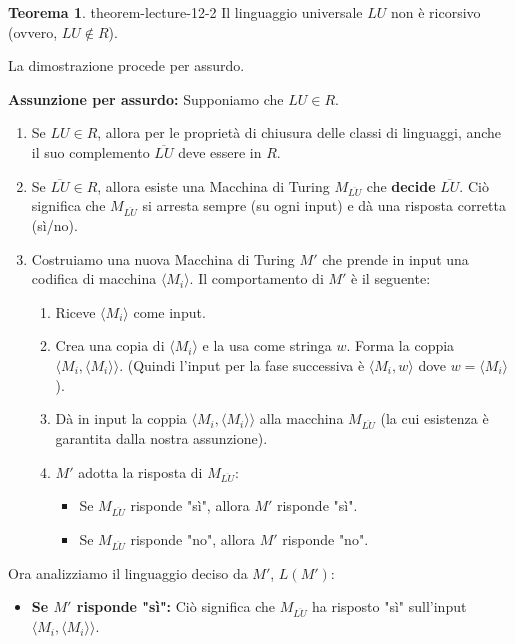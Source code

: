 \documentclass[a4paper]{article}
\makeatletter
\theoremstyle{definition} %
\newtheorem{theorem}{Teorema}
[section] %
\renewenvironment{proof}[1][\proofname]{\par
  \pushQED{\qed}%
  \normalfont \topsep6\p@\@plus6\p@\relax
  \trivlist
  \item[\hskip\labelsep
        \bfseries
    #1\@addpunct{.}]\ignorespaces
}{%
  \popQED\endtrivlist\@endpefalse
}
\makeatother
\begin{document}
\begin{theorem}{}{{ theorem-lecture-12-2 }}
Il linguaggio universale $LU$ non è ricorsivo (ovvero, $LU \notin R$).
\end{theorem}
\begin{proof}
La dimostrazione procede per assurdo.

\textbf{Assunzione per assurdo:} Supponiamo che $LU \in R$.
\begin{enumerate}
    \item Se $LU \in R$, allora per le proprietà di chiusura delle classi di linguaggi, anche il suo complemento $\overline{LU}$ deve essere in $R$.
    \item Se $\overline{LU} \in R$, allora esiste una Macchina di Turing $M_{\overline{LU}}$ che \textbf{decide} $\overline{LU}$. Ciò significa che $M_{\overline{LU}}$ si arresta sempre (su ogni input) e dà una risposta corretta (sì/no).
    \item Costruiamo una nuova Macchina di Turing $M'$ che prende in input una codifica di macchina $\langle M_i \rangle$. Il comportamento di $M'$ è il seguente:
    \begin{enumerate}
        \item Riceve $\langle M_i \rangle$ come input.
        \item Crea una copia di $\langle M_i \rangle$ e la usa come stringa $w$. Forma la coppia $\langle M_i, \langle M_i \rangle \rangle$. (Quindi l'input per la fase successiva è $\langle M_i, w \rangle$ dove $w = \langle M_i \rangle$).
        \item Dà in input la coppia $\langle M_i, \langle M_i \rangle \rangle$ alla macchina $M_{\overline{LU}}$ (la cui esistenza è garantita dalla nostra assunzione).
        \item $M'$ adotta la risposta di $M_{\overline{LU}}$:
        \begin{itemize}
            \item Se $M_{\overline{LU}}$ risponde "sì", allora $M'$ risponde "sì".
            \item Se $M_{\overline{LU}}$ risponde "no", allora $M'$ risponde "no".
        \end{itemize}
    \end{enumerate}
\end{enumerate}
Ora analizziamo il linguaggio deciso da $M'$, $L(M')$:
\begin{itemize}
    \item \textbf{Se $M'$ risponde "sì":}
    Ciò significa che $M_{\overline{LU}}$ ha risposto "sì" sull'input $\langle M_i, \langle M_i \rangle \rangle$.

\end{itemize}
\end{proof}
\end{document}

